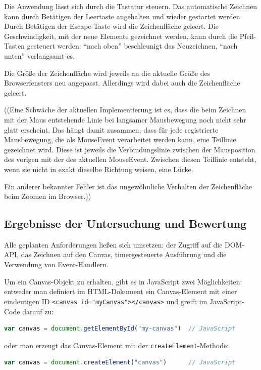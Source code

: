 \documentclass[a4paper, 12pt, hidelinks, listof=totoc, listoftables=totoc, bibliography=totoc]{scrreprt}
\newcommand{\js}[1]{\lstinline[language=JavaScript, style=inline]|#1|}
\newcommand{\html}[1]{\lstinline[language=HTML5, style=inline]|#1|}
\begin{document}
Die Anwendung lässt sich durch die Tastatur steuern. Das automatische Zeichnen kann durch Betätigen der Leertaste angehalten und wieder gestartet werden. Durch Betätigen der Escape-Taste wird die Zeichenfläche geleert. Die Geschwindigkeit, mit der neue Elemente gezeichnet werden, kann durch die Pfeil-Tasten gesteuert werden: "`nach oben"' beschleunigt das Neuzeichnen, "`nach unten"' verlangsamt es.

Die Größe der Zeichenfläche wird jeweils an die aktuelle Größe des Browserfensters neu angepasst. Allerdings wird dabei auch die Zeichenfläche geleert.

((Eine Schwäche der aktuellen Implementierung ist es, dass die beim Zeichnen mit der Maus entstehende Linie bei langsamer Mausbewegung noch nicht sehr glatt erscheint. Das hängt damit zusammen, dass für jede registrierte Mausbewegung, die als MouseEvent verarbeitet werden kann, eine Teillinie gezeichnet wird. Diese ist jeweils die Verbindungslinie zwischen der Mausposition des vorigen mit der des aktuellen MouseEvent. Zwischen diesen Teillinie entsteht, wenn sie nicht in exakt dieselbe Richtung weisen, eine Lücke.

Ein anderer bekannter Fehler ist das ungewöhnliche Verhalten der Zeichenfläche beim Zoomen im Browser.))


\subsection{Ergebnisse der Untersuchung und Bewertung}

Alle geplanten Anforderungen ließen sich umsetzen: der Zugriff auf die DOM-API, das Zeichnen auf den Canvas, timergesteuerte Ausführung und die Verwendung von Event-Handlern.

Um ein Canvas-Objekt zu erhalten, gibt es in JavaScript zwei Möglichkeiten: entweder man definiert im HTML-Dokument ein Canvas-Element mit einer eindeutigen ID \html{<canvas id="myCanvas"></canvas>} und greift im JavaScript-Code darauf zu:

\begin{lstlisting}[language=JavaScript, style=snippet]
var canvas = document.getElementById("my-canvas")  // JavaScript
\end{lstlisting}

oder man erzeugt das Canvas-Element mit der \js{createElement}-Methode:

\begin{lstlisting}[language=JavaScript, style=snippet]
var canvas = document.createElement("canvas")      // JavaScript
\end{lstlisting}
\end{document}
